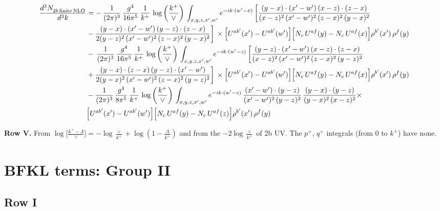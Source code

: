 \documentclass[9pt]{article}
\numberwithin{equation}{section}
\begin{document}
\begin{align}
    \frac{d^{3}N_{2b\,\rm finite\, NLO}^{\rm}}{d^{3}k} & =    -\, \frac{1}{(2\pi)^{3}}\,\frac{g^{4}}{16\pi^{5}}\,\frac{1}{k^{+}}\, \log{\left(\frac{k^{+}}{\vee}\right)}\,\int_{x,y,z,x',w'}e^{-ik\cdot(w'-x)}\, \bigg[\frac{(y-x)\cdot (x'-w')\,(x-z)\cdot (z-x)}{(x-z)^{2}\,(x'-w')^{2}\,(z-x)^{2}\,(y-x)^{2}}\notag \\ & -\frac{(y-x)\cdot (x'-w')\,(y-z)\cdot (z-x)}{2(y-z)^{2}\,(x'-w')^{2}\,(z-x)^{2}\,(y-x)^{2}}\bigg]\,\times \Big[U^{ab'}(x')-U^{ab'}(w')\Big]\Big[N_{c}\,U^{af}(y)-N_{c}\,U^{af}(x)\Big]\rho^{b'}(x')\,\rho^{f}(y)\notag \\ & -\, \frac{1}{(2\pi)^{3}}\,\frac{g^{4}}{16\pi^{5}}\,\frac{1}{k^{+}}\,\log{\left(\frac{k^{+}}{\vee}\right)}\,\int_{x,y,z,x',w'}e^{-ik\cdot(w'-z)}\,\bigg[\frac{(y-z)\cdot (x'-w')\,(x-z)\cdot (z-x)}{(x-z)^{2}\,(x'-w')^{2}\,(z-x)^{2}\,(y-z)^{2}}\notag \\ & +\frac{(y-x)\cdot (z-x)\,(y-z)\cdot (x'-w')}{2(y-x)^{2}\,(x'-w')^{2}\,(z-x)^{2}\,(y-z)^{2}}\bigg]\,\times \Big[U^{ab'}(x')-U^{ab'}(w')\Big]\Big[N_{c}\,U^{af}(y)-N_{c}\,U^{af}(x)\Big]\rho^{b'}(x')\,\rho^{f}(y)\notag \\ & - \frac{1}{(2\pi)^{3}}\,\frac{g^{4}}{8\pi^{5}}\,\frac{1}{k^{+}}\,\log{\left(\frac{k^{+}}{\vee}\right)}\,\int_{x,y,z,x',w'}e^{-ik\cdot(w'-z)}\,\frac{(x'-w')\cdot(y-z)}{(x'-w')^{2}\,(y-z)^{2}}\,\frac{(y-x)\cdot(y-z)}{(y-x)^{2}\,(x-z)^{2}}\times\notag \\ & \Big[U^{ab'}(x')-U^{ab'}(w')\Big]\Big[N_{c}\,U^{af}(y)-N_{c}\,U^{af}(z)\Big]\rho^{b'}(x')\,\rho^{f}(y)
\end{align}

\textbf{Row V.} From $\log\big[\frac{k^+-\Lambda}{\vee}\big]=-\log\frac{\vee}{k^+}+\log(1-\frac{\Lambda}{k^+})$ and from the $-2\log\frac{\vee}{k^+}$ of 2b UV. The $p^+$, $q^+$ integrals (from $0$ to $k^+$) have none.
\section{BFKL terms: Group II}
\subsection{Row I}
\end{document}
